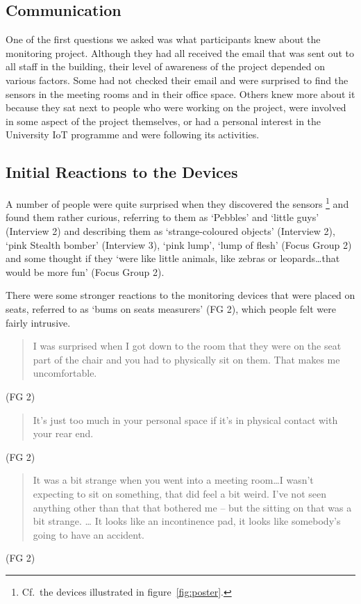 \subsection{Communication}
\label{sec:communication}

One of the first questions we asked was what participants knew about
the monitoring project. Although they had all received the email that
was sent out to all staff in the building, their level of awareness of
the project depended on various factors. Some had not checked their
email and were surprised to find the sensors in the meeting rooms and
in their office space. Others knew more about it because they sat next
to people who were working on the project, were involved in some
aspect of the project themselves, or had a personal interest in the
University IoT programme and were following its activities.

\subsection{Initial Reactions to the Devices}
\label{sec:init-reactions}

A number of people were quite surprised when they discovered the
sensors%
\footnote{ 
Cf.\ the devices illustrated in figure~\ref{fig:poster}.
}
and found them rather curious, referring to them as `Pebbles’
and ‘little guys’ (Interview 2) and describing them as
`strange-coloured objects’ (Interview 2), `pink Stealth bomber’
(Interview 3), `pink lump’, `lump of flesh’ (Focus Group 2) and some
thought if they `were like little animals, like zebras or
leopards\ldots that would be more fun’ (Focus Group 2).

There were some stronger reactions to the monitoring devices that were
placed on seats, referred to as `bums on seats measurers’ (FG 2),
which people felt were fairly intrusive.

\begin{quote}I was surprised when I got down to the room that they were on the
seat part of the chair and you had to physically sit on them. That
makes me uncomfortable.\end{quote} (FG 2)

\begin{quote}It’s just too much in your personal space if it’s in
  physical contact with your rear end.\end{quote} (FG 2)

\begin{quote}It was a bit strange when you went into a meeting room…I wasn’t
expecting to sit on something, that did feel a bit weird. I’ve not
seen anything other than that that bothered me – but the sitting on
that was a bit strange. … It looks like an incontinence pad, it looks
like somebody’s going to have an accident.\end{quote} (FG 2)

